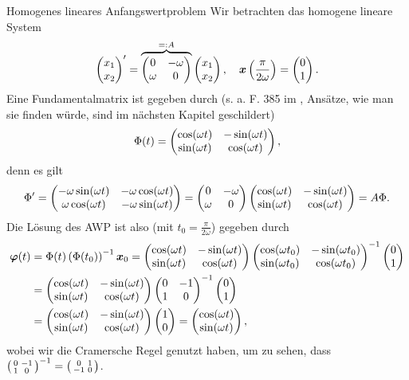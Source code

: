 \begin{Beispiel}
{Homogenes lineares Anfangswertproblem}
Wir betrachten das homogene lineare System
\begin{equation*}
    \begin{pmatrix}x_1\\x_2\end{pmatrix}'=\overbrace{\begin{pmatrix}0&-\omega\\\omega&0\end{pmatrix}}^{=:A}\begin{pmatrix}x_1\\x_2\end{pmatrix},\quad {{\text{\boldmath${x}$}}}\left({\frac{\pi}{2\omega}}\right)=\begin{pmatrix}0\\1\end{pmatrix}.
\end{equation*}
Eine Fundamentalmatrix ist gegeben durch (s. a. F. 385 im \Skript{}, Ansätze, wie man sie finden würde, sind im nächsten Kapitel geschildert)
\begin{equation*}
    \Phi(t)=\begin{pmatrix}\cos(\omega t)&-\sin(\omega t)\\\sin(\omega t)&\cos(\omega t)\end{pmatrix},
\end{equation*}
denn es gilt
\begin{equation*}
    \Phi'=\begin{pmatrix}-\omega\sin(\omega t)&-\omega\cos(\omega t)\\\omega\cos(\omega t)&-\omega\sin(\omega t)\end{pmatrix}=\begin{pmatrix}0&-\omega\\\omega &0\end{pmatrix}\begin{pmatrix}\cos(\omega t)&-\sin(\omega t)\\\sin(\omega t)&\cos(\omega t)\end{pmatrix}=A\Phi.
\end{equation*}
Die Lösung des AWP ist also (mit $t_0=\frac{\pi}{2\omega}$) gegeben durch
\begin{align*}
    {{\text{\boldmath${\varphi}$}}}(t)&=\Phi(t)\left({\Phi(t_0)}\right)^{-1}{{\text{\boldmath${x}$}}}_0=\begin{pmatrix}\cos(\omega t)&-\sin(\omega t)\\\sin(\omega t)&\cos(\omega t)\end{pmatrix}\begin{pmatrix}\cos(\omega t_0)&-\sin(\omega t_0)\\\sin(\omega t_0)&\cos(\omega t_0)\end{pmatrix}^{-1}\begin{pmatrix}0\\1\end{pmatrix}\\
    &=\begin{pmatrix}\cos(\omega t)&-\sin(\omega t)\\\sin(\omega t)&\cos(\omega t)\end{pmatrix}\begin{pmatrix}0&-1\\1&0\end{pmatrix}^{-1}\begin{pmatrix}0\\1\end{pmatrix}\\
    &=\begin{pmatrix}\cos(\omega t)&-\sin(\omega t)\\\sin(\omega t)&\cos(\omega t)\end{pmatrix}\begin{pmatrix}1\\0\end{pmatrix}=\begin{pmatrix}\cos(\omega t)\\\sin(\omega t)\end{pmatrix},
\end{align*}
wobei wir die Cramersche Regel genutzt haben, um zu sehen, dass $\left(\begin{smallmatrix}0&-1\\1&0\end{smallmatrix}\right)^{-1}=\left(\begin{smallmatrix}0&1\\-1&0\end{smallmatrix}\right)$.
\end{Beispiel}
